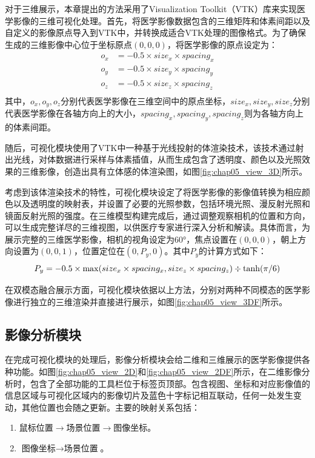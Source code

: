对于三维展示，本章提出的方法采用了Visualization Toolkit（VTK）库来实现医学影像的三维可视化处理。首先，将医学影像数据包含的三维矩阵和体素间距以及自定义的影像原点导入到VTK中，并转换成适合VTK处理的图像格式。为了确保生成的三维影像中心位于坐标原点\((0,0,0)\)，将医学影像的原点设定为：
\begin{equation}
    \begin{aligned}
        o_x & = -0.5 \times size_x \times spacing_x \\
        o_y & = -0.5 \times size_y \times spacing_y \\
        o_z & = -0.5 \times size_z \times spacing_z \\
    \end{aligned}
\end{equation}
其中，\(o_x,o_y,o_z\)分别代表医学影像在三维空间中的原点坐标，\(size_x,size_y,size_z\)分别代表医学影像在各轴方向上的大小，\(spacing_x,spacing_y,spacing_z\)则为各轴方向上的体素间距。

随后，可视化模块使用了VTK中一种基于光线投射的体渲染技术，该技术通过射出光线，对体数据进行采样与体素插值，从而生成包含了透明度、颜色以及光照效果的三维影像，创造出具有立体感的体渲染图，如图\ref{fig:chap05_view_3D}所示。

考虑到该体渲染技术的特性，可视化模块设定了将医学影像的影像值转换为相应颜色以及透明度的映射表，并设置了必要的光照参数，包括环境光照、漫反射光照和镜面反射光照的强度。在三维模型构建完成后，通过调整观察相机的位置和方向，可以生成完整详尽的三维视图，以供医疗专家进行深入分析和解读。具体而言，为展示完整的三维医学影像，相机的视角设定为60°，焦点设置在\((0,0,0)\)，朝上方向设置为\((0,0,1)\)，位置定位在\((0,P_y,0)\)。其中\(P_y\)的计算方式如下：
\begin{equation}
    P_y = -0.5 \times \max(size_x \times spacing_x, size_z \times spacing_z) \div \tanh(\pi / 6)\\
\end{equation}

在双模态融合展示方面，可视化模块依据以上方法，分别对两种不同模态的医学影像进行独立的三维渲染并直接进行展示，如图\ref{fig:chap05_view_3DF}所示。

\subsection{影像分析模块}

在完成可视化模块的处理后，影像分析模块会给二维和三维展示的医学影像提供各种功能。如图\ref{fig:chap05_view_2D}和\ref{fig:chap05_view_2DF}所示，在二维影像分析时，包含了全部功能的工具栏位于标签页顶部。包含视图、坐标和对应影像值的信息区域与可视化区域内的影像切片及蓝色十字标记相互联动，任何一处发生变动，其他位置也会随之更新。主要的映射关系包括：
\begin{enumerate}
    \item \(\text{鼠标位置} \rightarrow \text{场景位置} \rightarrow \text{图像坐标}\)\label{en:chap05_1}。
    \item \(\text{图像坐标} \rightarrow \text{场景位置}\)\label{en:chap05_2}。
\end{enumerate}

